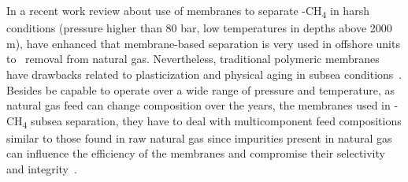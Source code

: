 In a recent work review about use of membranes to separate \CO-CH\textsubscript{4} in harsh conditions (pressure higher than 80 bar, low temperatures in depths above 2000 m), \citet{Cardoso2022} have enhanced that membrane-based separation is very used in offshore units to \CO~removal from natural gas. Nevertheless, traditional polymeric membranes have drawbacks related to plasticization and physical aging in subsea conditions~\citep{Cardoso2022}. Besides be capable to operate over a wide range of pressure and temperature, as natural gas feed can change composition over the years, the membranes used in \CO-CH\textsubscript{4} subsea separation, they have to deal  with multicomponent feed compositions similar to those found in raw natural gas since impurities present in natural gas can influence the efficiency of the membranes and compromise their selectivity and integrity~\citep{Cardoso2022}.

\newpage
